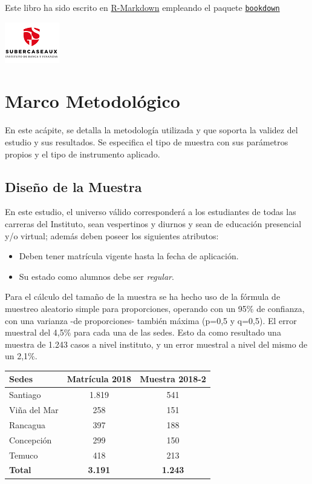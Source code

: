 \documentclass[]{book}
\providecommand{\tightlist}{%
  \setlength{\itemsep}{0pt}\setlength{\parskip}{0pt}}
\theoremstyle{definition}
\theoremstyle{definition}
\theoremstyle{definition}
\theoremstyle{remark}
\begin{document}
Este libro ha sido escrito en
\href{http://rmarkdown.rstudio.com}{R-Markdown} empleando el paquete
\href{https://bookdown.org/yihui/bookdown/}{\texttt{bookdown}}

\begin{flushleft}\includegraphics{images/IconoIGS} \end{flushleft}

\chapter{Marco Metodológico}\label{intro}

En este acápite, se detalla la metodología utilizada y que soporta la
validez del estudio y sus resultados. Se especifica el tipo de muestra
con sus parámetros propios y el tipo de instrumento aplicado.

\section{Diseño de la Muestra}\label{requisitos}

En este estudio, el universo válido corresponderá a los estudiantes de
todas las carreras del Instituto, sean vespertinos y diurnos y sean de
educación presencial y/o virtual; además deben poseer los siguientes
atributos:

\begin{itemize}
\tightlist
\item
  Deben tener matrícula vigente hasta la fecha de aplicación.
\item
  Su estado como alumnos debe ser \emph{regular}.
\end{itemize}

Para el cálculo del tamaño de la muestra se ha hecho uso de la fórmula
de muestreo aleatorio simple para proporciones, operando con un 95\% de
confianza, con una varianza -de proporciones- también máxima (p=0,5 y
q=0,5). El error muestral del 4,5\% para cada una de las sedes. Esto da
como resultado una muestra de 1.243 casos a nivel instituto, y un error
muestral a nivel del mismo de un 2,1\%.

\begin{longtable}[]{@{}lcc@{}}
\toprule
Sedes & Matrícula 2018 & Muestra 2018-2\tabularnewline
\midrule
\endhead
Santiago & 1.819 & 541\tabularnewline
Viña del Mar & 258 & 151\tabularnewline
Rancagua & 397 & 188\tabularnewline
Concepción & 299 & 150\tabularnewline
Temuco & 418 & 213\tabularnewline
\textbf{Total} & \textbf{3.191} & \textbf{1.243}\tabularnewline
\bottomrule
\end{longtable}
\end{document}
